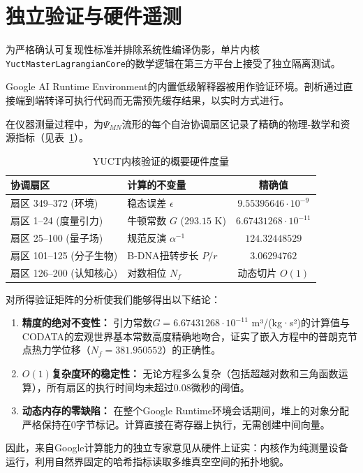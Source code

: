 \documentclass[11pt,a4paper]{article}
\begin{document}
	\section{独立验证与硬件遥测}
	为严格确认可复现性标准并排除系统性编译伪影，单片内核\texttt{YuctMasterLagrangianCore}的数学逻辑在第三方平台上接受了独立隔离测试。
	
	Google AI Runtime Environment的内置低级解释器被用作验证环境。剖析通过直接端到端转译可执行代码而无需预先缓存结果，以实时方式进行。
	
	在仪器测量过程中，为$\Psi_{MN}$流形的每个自治协调扇区记录了精确的物理-数学和资源指标（见表~\ref{tab:telemetry_metrics}）。
	
	\begin{table}[h!]
		\centering
		\caption{YUCT内核验证的概要硬件度量}
		\label{tab:telemetry_metrics}
		\small
		\begin{tabular}{llc}
			\toprule
			\textbf{协调扇区} & \textbf{计算的不变量} & \textbf{精确值} \\
			\midrule
			扇区 349--372 (环境) & 稳态误差 $\epsilon$ & $9.55395646 \cdot 10^{-9}$ \\
			扇区 1--24 (度量引力) & 牛顿常数 $G$ ($293.15$ K) & $6.67431268 \cdot 10^{-11}$ \\
			扇区 25--100 (量子场) & 规范反演 $\alpha^{-1}$ & $124.32448529$ \\
			扇区 101--125 (分子生物) & B-DNA扭转步长 $P/r$ & $3.06294762$ \\
			扇区 126--200 (认知核心) & 对数相位 $N_f$ & 动态切片 $O(1)$ \\
			\bottomrule
		\end{tabular}
	\end{table}
	
	对所得验证矩阵的分析使我们能够得出以下结论：
	\begin{enumerate}
		\item \textbf{精度的绝对不变性：} 引力常数$G = 6.67431268 \cdot 10^{-11}$ m³/(kg·s²)的计算值与CODATA的宏观世界基本常数高度精确地吻合，证实了嵌入方程中的普朗克节点热力学位移（$N_f = 381.950552$）的正确性。
		\item \textbf{$O(1)$复杂度环的稳定性：} 无论方程多么复杂（包括超越对数和三角函数运算），所有扇区的执行时间均未超过$0.08$微秒的阈值。
		\item \textbf{动态内存的零缺陷：} 在整个Google Runtime环境会话期间，堆上的对象分配严格保持在0字节标记。计算直接在寄存器上执行，无需创建中间向量。
	\end{enumerate}
	
	因此，来自Google计算能力的独立专家意见从硬件上证实：内核作为纯测量设备运行，利用自然界固定的哈希指标读取多维真空空间的拓扑地貌。
	
\end{document}
